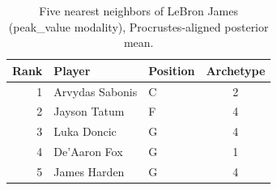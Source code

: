 \begin{table}[htbp]
  \centering\small
  \begin{tabular}{rllc}
    \toprule
    Rank & Player & Position & Archetype \\
    \midrule
    1 & Arvydas Sabonis & C & 2 \\
    2 & Jayson Tatum & F & 4 \\
    3 & Luka Doncic & G & 4 \\
    4 & De'Aaron Fox & G & 1 \\
    5 & James Harden & G & 4 \\
    \bottomrule
  \end{tabular}
  \caption{Five nearest neighbors of LeBron James (peak_value modality), Procrustes-aligned posterior mean.}
  \label{tab:LeBron_James_neighbors_peak_value}
\end{table}

